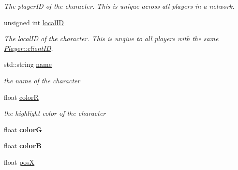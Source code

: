 \begin{DoxyCompactItemize}
\begin{DoxyCompactList}\small\item\em The player\-I\-D of the character. This is unique across all players in a network. \end{DoxyCompactList}\item 
\hypertarget{class_game_state_1_1_player_ab1600ee9b9d01027e5304e991be11407}{unsigned int \hyperlink{class_game_state_1_1_player_ab1600ee9b9d01027e5304e991be11407}{local\-I\-D}}\label{class_game_state_1_1_player_ab1600ee9b9d01027e5304e991be11407}

\begin{DoxyCompactList}\small\item\em The local\-I\-D of the character. This is unqiue to all players with the same \hyperlink{class_game_state_1_1_player_aacc123df8ea5256f83c1060a5fdd19c2}{Player\-::client\-I\-D}. \end{DoxyCompactList}\item 
\hypertarget{class_game_state_1_1_player_a6638478952037ab0d1b3b0a3c496a820}{std\-::string \hyperlink{class_game_state_1_1_player_a6638478952037ab0d1b3b0a3c496a820}{name}}\label{class_game_state_1_1_player_a6638478952037ab0d1b3b0a3c496a820}

\begin{DoxyCompactList}\small\item\em the name of the character \end{DoxyCompactList}\item 
\hypertarget{class_game_state_1_1_player_a54b350ee750dd994b421ad4332448112}{float \hyperlink{class_game_state_1_1_player_a54b350ee750dd994b421ad4332448112}{color\-R}}\label{class_game_state_1_1_player_a54b350ee750dd994b421ad4332448112}

\begin{DoxyCompactList}\small\item\em the highlight color of the character \end{DoxyCompactList}\item 
\hypertarget{class_game_state_1_1_player_a26c9551e961a1f601fd689f3677ce277}{float {\bfseries color\-G}}\label{class_game_state_1_1_player_a26c9551e961a1f601fd689f3677ce277}

\item 
\hypertarget{class_game_state_1_1_player_ad3f992ed5676471f80c6ba3c9ce0f505}{float {\bfseries color\-B}}\label{class_game_state_1_1_player_ad3f992ed5676471f80c6ba3c9ce0f505}

\item 
\hypertarget{class_game_state_1_1_player_a0342f6d74f9c08351cd0c5139ac55de6}{float \hyperlink{class_game_state_1_1_player_a0342f6d74f9c08351cd0c5139ac55de6}{pos\-X}}\label{class_game_state_1_1_player_a0342f6d74f9c08351cd0c5139ac55de6}


\end{DoxyCompactItemize}
